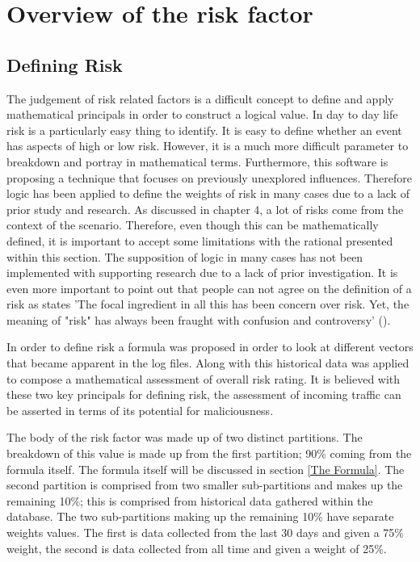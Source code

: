 \section{Overview of the risk factor}
\subsection{Defining Risk} \label{Define Risk}
The judgement of risk related factors is a difficult concept to define and apply mathematical principals in order to construct a logical value. In day to day life risk is a particularly easy thing to identify. It is easy to define whether an event has aspects of high or low risk. However, it is a much more difficult parameter to breakdown and portray in mathematical terms. Furthermore, this software is proposing a technique that focuses on previously unexplored influences. Therefore logic has been applied to define the weights of risk in many cases due to a lack of prior study and research. As discussed in chapter 4, a lot of risks come from the context of the scenario. Therefore, even though this can be mathematically defined, it is important to accept some limitations with the rational presented within this section. The supposition of logic in many cases has not been implemented with supporting research due to a lack of prior investigation. It is even more important to point out that people can not agree on the definition of a risk as \citeauthor{fischhoff1984defining} states 'The focal ingredient in all this has been concern over risk. Yet, the meaning of "risk" has always been fraught with confusion and controversy' (\cite{fischhoff1984defining}).

In order to define risk a formula was proposed in order to look at different vectors that became apparent in the log files. Along with this historical data was applied to compose a mathematical assessment of overall risk rating. It is believed with these two key principals for defining risk, the assessment of incoming traffic can be asserted in terms of its potential for maliciousness.

The body of the risk factor was made up of two distinct partitions. The breakdown of this value is made up from the first partition; 90\% coming from the formula itself. The formula itself will be discussed in section \ref{The Formula}. The second partition is comprised from two smaller sub-partitions and makes up the remaining 10\%; this is comprised from historical data gathered within the database. The two sub-partitions making up the remaining 10\%  have separate weights values. The first is data collected from the last 30 days and given a 75\% weight, the second is data collected from all time and given a weight of 25\%.

